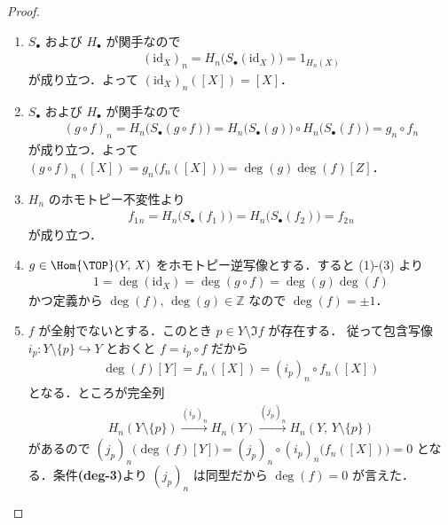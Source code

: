 \documentclass[algtopo_main]{subfiles}
\begin{document}
\begin{proof}
    \begin{enumerate}
        \item $S_\bullet$ および $H_\bullet$ が関手なので
        \begin{align}
            (\mathrm{id}_X)_n = H_n \bigl( S_\bullet (\mathrm{id}_X) \bigr) = 1_{H_n(X)}
        \end{align}
        が成り立つ．よって $(\mathrm{id}_X)_n([X]) = [X]$．
        \item $S_\bullet$ および $H_\bullet$ が関手なので
        \begin{align}
            (g\circ f)_n = H_n \bigl( S_\bullet (g\circ f) \bigr) = H_n \bigl( S_\bullet (g) \bigr) \circ H_n \bigl( S_\bullet (f) \bigr) = g_n \circ f_n
        \end{align}
        が成り立つ．よって $(g\circ f)_n ([X]) = g_n \bigl( f_n([X]) \bigr) = \deg(g)\deg(f)[Z]$．
        \item $H_n$ のホモトピー不変性より
        \begin{align}
            f_1{}_n = H_n \bigl( S_\bullet (f_1) \bigr) =  H_n \bigl( S_\bullet (f_2) \bigr) = f_2{}_n
        \end{align}
        が成り立つ．
        \item $g \in \Hom{\TOP}(Y,\, X)$ をホモトピー逆写像とする．すると (1)-(3) より
        \begin{align}
            1 = \deg(\mathrm{id}_X) = \deg(g \circ f) = \deg(g)\deg(f)
        \end{align}
        かつ定義から $\deg(f),\, \deg (g) \in \mathbb{Z}$ なので $\deg(f) = \pm 1$．
        \item $f$ が全射でないとする．このとき $p \in Y\setminus \Im f$ が存在する．
        従って包含写像 $i_p \colon Y \setminus \{p\} \hookrightarrow Y$ とおくと $f = i_p \circ f$ だから
        \begin{align}
            \deg(f)[Y] = f_n([X]) = (i_p)_n \circ f_n ([X])
        \end{align}
        となる．ところが完全列
        \begin{align}
            H_n(Y \setminus \{p\}) \xrightarrow{(i_p)_n} H_n(Y) \xrightarrow{(j_p)_n} H_n(Y,\, Y\setminus\{p\})
        \end{align}
        があるので $(j_p)_n \bigl( \deg(f)[Y] \bigr) = (j_p)_n \circ (i_p)_n \bigl( f_n ([X]) \bigr) = 0$ となる．条件\textbf{\textsf{(deg-3)}}より $(j_p)_n$ は同型だから $\deg(f) = 0$ が言えた．
    \end{enumerate}
\end{proof}
\end{document}
